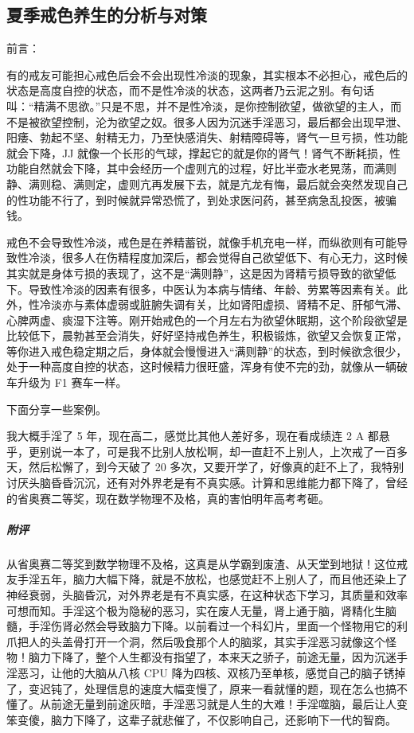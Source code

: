 \subsection{夏季戒色养生的分析与对策}

前言：

有的戒友可能担心戒色后会不会出现性冷淡的现象，其实根本不必担心，戒色后的状态是高度自控的状态，而不是性冷淡的状态，这两者乃云泥之别。有句话叫：“精满不思欲。”只是不思，并不是性冷淡，是你控制欲望，做欲望的主人，而不是被欲望控制，沦为欲望之奴。很多人因为沉迷手淫恶习，最后都会出现早泄、阳痿、勃起不坚、射精无力，乃至快感消失、射精障碍等，肾气一旦亏损，性功能就会下降，JJ 就像一个长形的气球，撑起它的就是你的肾气！肾气不断耗损，性功能自然就会下降，其中会经历一个虚则亢的过程，好比半壶水老晃荡，而满则静、满则稳、满则定，虚则亢再发展下去，就是亢龙有悔，最后就会突然发现自己的性功能不行了，到时候就异常恐慌了，到处求医问药，甚至病急乱投医，被骗钱。

戒色不会导致性冷淡，戒色是在养精蓄锐，就像手机充电一样，而纵欲则有可能导致性冷淡，很多人在伤精程度加深后，都会觉得自己欲望低下、有心无力，这时候其实就是身体亏损的表现了，这不是“满则静”，这是因为肾精亏损导致的欲望低下。导致性冷淡的因素有很多，中医认为本病与情绪、年龄、劳累等因素有关。此外，性冷淡亦与素体虚弱或脏腑失调有关，比如肾阳虚损、肾精不足、肝郁气滞、心脾两虚、痰湿下注等。刚开始戒色的一个月左右为欲望休眠期，这个阶段欲望是比较低下，晨勃甚至会消失，好好坚持戒色养生，积极锻炼，欲望又会恢复正常，等你进入戒色稳定期之后，身体就会慢慢进入“满则静”的状态，到时候欲念很少，处于一种高度自控的状态，这时候精力很旺盛，浑身有使不完的劲，就像从一辆破车升级为 F1 赛车一样。

下面分享一些案例。

\begin{case}
    我大概手淫了 5 年，现在高二，感觉比其他人差好多，现在看成绩连 2 A 都悬乎，更别说一本了，可是我不比别人放松啊，却一直赶不上别人，上次戒了一百多天，然后松懈了，到今天破了 20 多次，又要开学了，好像真的赶不上了，我特别讨厌头脑昏昏沉沉，还有对外界老是有不真实感。计算和思维能力都下降了，曾经的省奥赛二等奖，现在数学物理不及格，真的害怕明年高考考砸。
    \subparagraph{附评} 从省奥赛二等奖到数学物理不及格，这真是从学霸到废渣、从天堂到地狱！这位戒友手淫五年，脑力大幅下降，就是不放松，也感觉赶不上别人了，而且他还染上了神经衰弱，头脑昏沉，对外界老是有不真实感，在这种状态下学习，其质量和效率可想而知。手淫这个极为隐秘的恶习，实在废人无量，肾上通于脑，肾精化生脑髓，手淫伤肾必然会导致脑力下降。以前看过一个科幻片，里面一个怪物用它的利爪把人的头盖骨打开一个洞，然后吸食那个人的脑浆，其实手淫恶习就像这个怪物！脑力下降了，整个人生都没有指望了，本来天之骄子，前途无量，因为沉迷手淫恶习，让他的大脑从八核 CPU 降为四核、双核乃至单核，感觉自己的脑子锈掉了，变迟钝了，处理信息的速度大幅变慢了，原来一看就懂的题，现在怎么也搞不懂了。从前途无量到前途灰暗，手淫恶习就是人生的大难！手淫噬脑，最后让人变笨变傻，脑力下降了，这辈子就悲催了，不仅影响自己，还影响下一代的智商。
\end{case}

